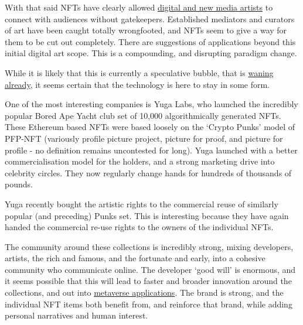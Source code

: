 With that said NFTs have clearly allowed \href{https://en.wikipedia.org/wiki/List_of_most_expensive_non-fungible_tokens}{digital and new media artists} to connect with audiences without gatekeepers. Established mediators and curators of art have been caught totally wrongfooted, and NFTs seem to give a way for them to be cut out completely. There are suggestions of applications beyond this initial digital art scope. This is a compounding, and disrupting paradigm change.\par
While it is likely that this is currently a speculative bubble, that is \href{https://www.bbc.co.uk/news/business-61102759}{waning already}, it seems certain that the technology is here to stay in some form.\par
One of the most interesting companies is Yuga Labs, who launched the incredibly popular Bored Ape Yacht club set of 10,000 algorithmically generated NFTs. These Ethereum based NFTs were based loosely on the `Crypto Punks' model of PFP-NFT (variously profile picture project, picture for proof, and picture for profile - no definition remains uncontested for long). Yuga launched with a better commercialisation model for the holders, and a strong marketing drive into celebrity circles. They now regularly change hands for hundreds of thousands of pounds.\par
Yuga recently bought the artistic rights to the commercial reuse of similarly popular (and preceding) Punks set. This is interesting because they have again handed the commercial re-use rights to the owners of the individual NFTs. \par
The community around these collections is incredibly strong, mixing developers, artists, the rich and famous, and the fortunate and early, into a cohesive community who communicate online. The developer `good will' is enormous, and it seems possible that this will lead to faster and broader innovation around the collections, and out into \href{https://twitter.com/yugalabs/status/1505014986556551172?}{metaverse applications}. The brand is strong, and the individual NFT items both benefit from, and reinforce that brand, while adding personal narratives and human interest.\par 
